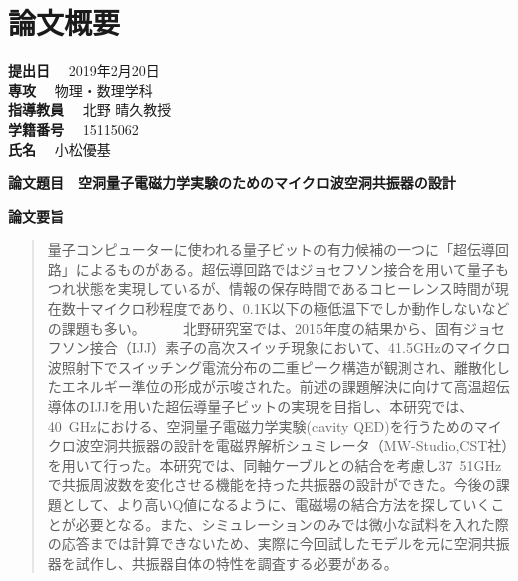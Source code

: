 \chapter*{論文概要}
\thispagestyle{empty}
\begin{flushleft}
  \textbf{提出日}  　2019年2月20日\\
  \textbf{専攻} 　物理・数理学科\\
  \textbf{指導教員} 　北野 晴久教授 \\
  \textbf{学籍番号} 　15115062\\
  \textbf{氏名} 　小松優基\\

\end{flushleft}
\textbf{論文題目}　\textbf{空洞量子電磁力学実験のためのマイクロ波空洞共振器の設計}\\
\thispagestyle{empty}

\textbf{論文要旨}

\begin{abstract}
量子コンピューターに使われる量子ビットの有力候補の一つに「超伝導回路」によるものがある。超伝導回路ではジョセフソン接合を用いて量子もつれ状態を実現しているが、情報の保存時間であるコヒーレンス時間が現在数十マイクロ秒程度であり、0.1K以下の極低温下でしか動作しないなどの課題も多い。
　
　北野研究室では、2015年度の結果から、固有ジョセフソン接合（IJJ）素子の高次スイッチ現象において、41.5GHzのマイクロ波照射下でスイッチング電流分布の二重ピーク構造が観測され、離散化したエネルギー準位の形成が示唆された。前述の課題解決に向けて高温超伝導体のIJJを用いた超伝導量子ビットの実現を目指し、本研究では、40~GHzにおける、空洞量子電磁力学実験(cavity QED)を行うためのマイクロ波空洞共振器の設計を電磁界解析シュミレータ（MW-Studio,CST社）を用いて行った。本研究では、同軸ケーブルとの結合を考慮し37~51GHzで共振周波数を変化させる機能を持った共振器の設計ができた。今後の課題として、より高いQ値になるように、電磁場の結合方法を探していくことが必要となる。また、シミュレーションのみでは微小な試料を入れた際の応答までは計算できないため、実際に今回試したモデルを元に空洞共振器を試作し、共振器自体の特性を調査する必要がある。
\end{abstract}
